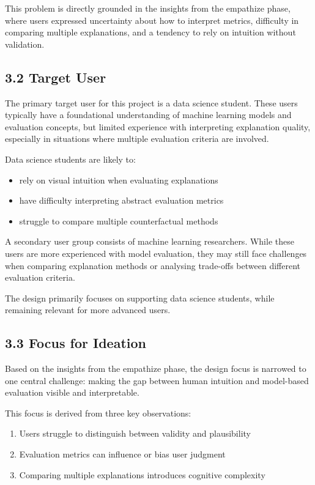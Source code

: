 \documentclass[
  letterpaper,
  DIV=11,
  numbers=noendperiod]{scrartcl}
\providecommand{\tightlist}{%
  \setlength{\itemsep}{0pt}\setlength{\parskip}{0pt}}\usepackage{longtable,booktabs,array}
\begin{document}
This problem is directly grounded in the insights from the empathize
phase, where users expressed uncertainty about how to interpret metrics,
difficulty in comparing multiple explanations, and a tendency to rely on
intuition without validation.

\subsection{3.2 Target User}\label{target-user}

The primary target user for this project is a data science student.
These users typically have a foundational understanding of machine
learning models and evaluation concepts, but limited experience with
interpreting explanation quality, especially in situations where
multiple evaluation criteria are involved.

Data science students are likely to:

\begin{itemize}
\tightlist
\item
  rely on visual intuition when evaluating explanations
\item
  have difficulty interpreting abstract evaluation metrics
\item
  struggle to compare multiple counterfactual methods
\end{itemize}

A secondary user group consists of machine learning researchers. While
these users are more experienced with model evaluation, they may still
face challenges when comparing explanation methods or analysing
trade-offs between different evaluation criteria.

The design primarily focuses on supporting data science students, while
remaining relevant for more advanced users.

\subsection{3.3 Focus for Ideation}\label{focus-for-ideation}

Based on the insights from the empathize phase, the design focus is
narrowed to one central challenge: making the gap between human
intuition and model-based evaluation visible and interpretable.

This focus is derived from three key observations:

\begin{enumerate}
\def\labelenumi{\arabic{enumi}.}
\tightlist
\item
  Users struggle to distinguish between validity and plausibility
\item
  Evaluation metrics can influence or bias user judgment
\item
  Comparing multiple explanations introduces cognitive complexity
\end{enumerate}
\end{document}
